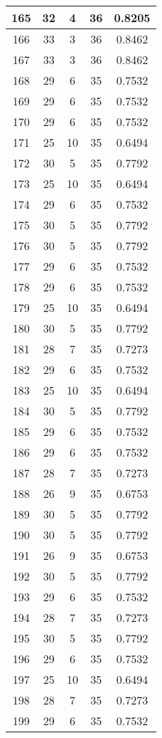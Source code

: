 \documentclass[letterpaper, 12pt]{article}
\begin{document}
\begin{longtable}{|c|c|c|c|c|}
\hline
165 & 32 & 4 & 36 & 0.8205 \\
\hline
166 & 33 & 3 & 36 & 0.8462 \\
\hline
167 & 33 & 3 & 36 & 0.8462 \\
\hline
168 & 29 & 6 & 35 & 0.7532 \\
\hline
169 & 29 & 6 & 35 & 0.7532 \\
\hline
170 & 29 & 6 & 35 & 0.7532 \\
\hline
171 & 25 & 10 & 35 & 0.6494 \\
\hline
172 & 30 & 5 & 35 & 0.7792 \\
\hline
173 & 25 & 10 & 35 & 0.6494 \\
\hline
174 & 29 & 6 & 35 & 0.7532 \\
\hline
175 & 30 & 5 & 35 & 0.7792 \\
\hline
176 & 30 & 5 & 35 & 0.7792 \\
\hline
177 & 29 & 6 & 35 & 0.7532 \\
\hline
178 & 29 & 6 & 35 & 0.7532 \\
\hline
179 & 25 & 10 & 35 & 0.6494 \\
\hline
180 & 30 & 5 & 35 & 0.7792 \\
\hline
181 & 28 & 7 & 35 & 0.7273 \\
\hline
182 & 29 & 6 & 35 & 0.7532 \\
\hline
183 & 25 & 10 & 35 & 0.6494 \\
\hline
184 & 30 & 5 & 35 & 0.7792 \\
\hline
185 & 29 & 6 & 35 & 0.7532 \\
\hline
186 & 29 & 6 & 35 & 0.7532 \\
\hline
187 & 28 & 7 & 35 & 0.7273 \\
\hline
188 & 26 & 9 & 35 & 0.6753 \\
\hline
189 & 30 & 5 & 35 & 0.7792 \\
\hline
190 & 30 & 5 & 35 & 0.7792 \\
\hline
191 & 26 & 9 & 35 & 0.6753 \\
\hline
192 & 30 & 5 & 35 & 0.7792 \\
\hline
193 & 29 & 6 & 35 & 0.7532 \\
\hline
194 & 28 & 7 & 35 & 0.7273 \\
\hline
195 & 30 & 5 & 35 & 0.7792 \\
\hline
196 & 29 & 6 & 35 & 0.7532 \\
\hline
197 & 25 & 10 & 35 & 0.6494 \\
\hline
198 & 28 & 7 & 35 & 0.7273 \\
\hline
199 & 29 & 6 & 35 & 0.7532 \\
\hline
\end{longtable}
\end{document}

